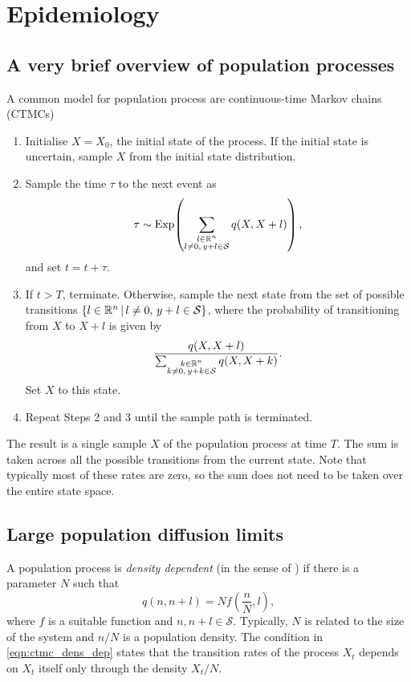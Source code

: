 \section{Epidemiology}


\subsection{A very brief overview of population processes}


A common model for population process are continuous-time Markov chains (CTMCs)

\begin{enumerate}
	\item Initialise \(X = X_0\), the initial state of the process.
	      If the initial state is uncertain, sample \(X\) from the initial state distribution.

	\item Sample the time \(\tau\) to the next event as
	      \[
		      \tau \sim\mathrm{Exp}\!\left(\sum_{\substack{l \in \mathbb{R}^n \\ l \neq 0,\, y + l \in \mathcal{S}}}{q\!\left(X, X + l\right)}\right),
	      \]
	      and set \(t = t + \tau\).

	\item If \(t > T\), terminate.
	      Otherwise, sample the next state from the set of possible transitions \(\left\{l \in \mathbb{R}^n\,\middle|\,l \neq 0,\, y + l \in \mathcal{S}\right\}\), where the probability of transitioning from \(X\) to \(X + l\) is given by
	      \[
		      \frac{q\!\left(X, X + l\right)}{\sum_{\substack{k \in \mathbb{R}^n \\ k \neq 0,\, y + k \in \mathcal{S}}}{q\!\left(X, X + k\right)}}.
	      \]
	      Set \(X\) to this state.

	\item Repeat Steps 2 and 3 until the sample path is terminated.

\end{enumerate}
The result is a single sample \(X\) of the population process at time \(T\).
The sum is taken across all the possible transitions from the current state.
Note that typically most of these rates are zero, so the sum does not need to be taken over the entire state space.

\subsection{Large population diffusion limits}

A population process is \emph{density dependent} (in the sense of \citet{Kurtz_1970_SolutionsOrdinaryDifferential}) if there is a parameter \(N\) such that
\begin{equation}
	q\!\left(n, n+l\right) = Nf\!\left(\frac{n}{N}, l\right),
	\label{eqn:ctmc_dens_dep}
\end{equation}
where \(f\) is a suitable function and \(n, n+l \in \mathcal{S}\).
Typically, \(N\) is related to the size of the system and \(n / N\) is a population density.
The condition in \cref{eqn:ctmc_dens_dep} states that the transition rates of the process \(X_t\) depends on \(X_t\) itself only through the density \(X_t / N\).

